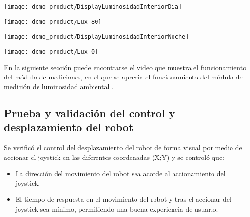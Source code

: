 \begin{center}
\texttt{[image: demo\_product/DisplayLuminosidadInteriorDia]}
  \label{fig:DisplayLuminosidadInteriorDia}
\end{center}

\begin{center}
\texttt{[image: demo\_product/Lux\_80]}
  \label{fig:Lux_80}
\end{center}


\begin{center}
\texttt{[image: demo\_product/DisplayLuminosidadInteriorNoche]}
  \label{fig:DisplayLuminosidadInteriorNoche}
\end{center}

\begin{center}
\texttt{[image: demo\_product/Lux\_0]}
  \label{fig:Lux_0}
\end{center}

En la siguiente sección puede encontrarse el video que muestra el funcionamiento del módulo de mediciones, en el que se aprecia el funcionamiento del módulo de medición de luminosidad ambiental \cite{Demo_Mediciones}.


\vspace{2cm}


\subsection{Prueba y validación del control y desplazamiento del robot}

Se verificó el control del desplazamiento del robot de forma visual por medio de accionar el joystick en las diferentes coordenadas (X;Y) y se controló que:

\begin{itemize}
	\item La dirección del movimiento del robot sea acorde al accionamiento del joystick.
	\item El tiempo de respuesta en el movimiento del robot y tras el accionar del joystick sea mínimo, permitiendo una buena experiencia de usuario.
\end{itemize}

